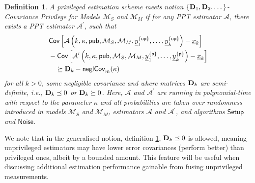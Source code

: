 \documentclass[letterpaper, 10 pt, conference]{ieeeconf}
\newtheorem{definition}{Definition}[section]
\begin{document}
\begin{definition}\label{def:cov_priv_security_notion}
  A privileged estimation scheme meets notion \textit{$\{{{\mathbf{D}}}_1,{{\mathbf{D}}}_2,\dots\}$-Covariance Privilege for Models $\mathcal{M}_S$ and $\mathcal{M}_M$} if for any PPT estimator $\mathcal{A}$, there exists a PPT estimator $\mathcal{A}^\prime$, such that
  \begin{equation}
    \begin{split}
      &\mathsf{Cov}\left[\mathcal{A}\left(k,\kappa,\mathsf{pub},\mathcal{M}_S,\mathcal{M}_M,{\underline{y}}^{\{\mathsf{up}\}}_1,\dots,{\underline{y}}^{\{\mathsf{up}\}}_k\right) - {\underline{x}}_k\right]\\
      &-\mathsf{Cov}\left[\mathcal{A}^\prime\left(k,\kappa,\mathsf{pub},\mathcal{M}_S,\mathcal{M}_M,{\underline{y}}^{\{\mathsf{p}\}}_1,\dots,{\underline{y}}^{\{\mathsf{p}\}}_k\right) - {\underline{x}}_k\right]\\
      &\quad\succeq {\ensuremath{{\mathbf{D}}}}_k - \mathsf{neglCov}_m(\kappa)
    \end{split}
  \end{equation}
  for all $k>0$, some negligible covariance and where matrices ${{\mathbf{D}}}_k$ are semi-definite, \textit{i.e.}, ${{\mathbf{D}}}_k \preceq 0$ or ${{\mathbf{D}}}_k \succeq 0$. Here, $\mathcal{A}$ and $\mathcal{A}^\prime$ are running in polynomial-time with respect to the parameter $\kappa$ and all probabilities are taken over randomness introduced in models $\mathcal{M}_S$ and $\mathcal{M}_M$, estimators $\mathcal{A}$ and $\mathcal{A}^\prime$, and algorithms $\mathsf{Setup}$ and $\mathsf{Noise}$.
\end{definition}

We note that in the generalised notion, definition \ref{def:cov_priv_security_notion}, ${{\mathbf{D}}}_k\preceq 0$ is allowed, meaning unprivileged estimators may have lower error covariances (perform better) than privileged ones, albeit by a bounded amount. This feature will be useful when discussing additional estimation performance gainable from fusing unprivileged measurements.

% 
%                                                                      
%                                                                      
%                                                                      
% 
\end{document}
